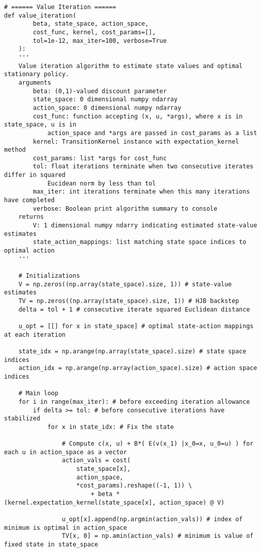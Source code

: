 \documentclass[10pt]{article}
\newcommand{\1}[1]{\mathbbm{1}_{#1}}
\begin{document}
    \begin{verbatim}
# ====== Value Iteration ======
def value_iteration(
        beta, state_space, action_space,
        cost_func, kernel, cost_params=[],
        tol=1e-12, max_iter=100, verbose=True
    ):
    '''
    Value iteration algorithm to estimate state values and optimal stationary policy.
    arguments
        beta: (0,1)-valued discount parameter
        state_space: 0 dimensional numpy ndarray
        action_space: 0 dimensional numpy ndarray
        cost_func: function accepting (x, u, *args), where x is in state_space, u is in
            action_space and *args are passed in cost_params as a list
        kernel: TransitionKernel instance with expectation_kernel method
        cost_params: list *args for cost_func
        tol: float iterations terminate when two consecutive iterates differ in squared
            Eucidean norm by less than tol
        max_iter: int iterations terminate when this many iterations have completed
        verbose: Boolean print algorithm summary to console
    returns
        V: 1 dimensional numpy ndarry indicating estimated state-value estimates
        state_action_mappings: list matching state space indices to optimal action
    '''

    # Initializations
    V = np.zeros((np.array(state_space).size, 1)) # state-value estimates
    TV = np.zeros((np.array(state_space).size, 1)) # HJB backstep
    delta = tol + 1 # consecutive iterate squared Euclidean distance

    u_opt = [[] for x in state_space] # optimal state-action mappings at each iteration

    state_idx = np.arange(np.array(state_space).size) # state space indices
    action_idx = np.arange(np.array(action_space).size) # action space indices

    # Main loop
    for i in range(max_iter): # before exceeding iteration allowance
        if delta >= tol: # before consecutive iterations have stabilized
            for x in state_idx: # Fix the state

                # Compute c(x, u) + B*( E(v(x_1) |x_0=x, u_0=u) ) for each u in action_space as a vector
                action_vals = cost(
                    state_space[x],
                    action_space,
                    *cost_params).reshape((-1, 1)) \
                        + beta * (kernel.expectation_kernel(state_space[x], action_space) @ V)

                u_opt[x].append(np.argmin(action_vals)) # index of minimum is optimal in action_space
                TV[x, 0] = np.amin(action_vals) # minimum is value of fixed state in state_space


\end{verbatim}
\end{document}
